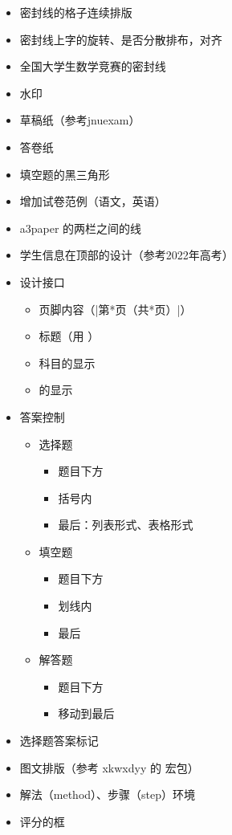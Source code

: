 \documentclass{ccnudoc}
\begin{document}
\begin{itemize}
  \item 密封线的格子连续排版
  \item 密封线上字的旋转、是否分散排布，对齐
  \item 全国大学生数学竞赛的密封线
  \item 水印
  \item 草稿纸（参考jnuexam）
  \item 答卷纸
  \item 填空题的黑三角形
  \item 增加试卷范例（语文，英语）
  \item a3paper 的两栏之间的线
    \begin{latexcode}[gobble = 6]
      \setlength{\columnseprule}{0.4pt}
    \end{latexcode}
  \item 学生信息在顶部的设计（参考2022年高考）
  \item 设计接口
    \begin{itemize}
      \item 页脚内容（|第*页（共*页）|）
      \item 标题（用 ）
      \item 科目的显示
      \item {} 的显示
    \end{itemize}
  \item 答案控制
    \begin{itemize}
      \item 选择题
        \begin{itemize}
          \item 题目下方
          \item 括号内
          \item 最后：列表形式、表格形式
        \end{itemize}
      \item 填空题
        \begin{itemize}
          \item 题目下方
          \item 划线内
          \item 最后
        \end{itemize}
      \item 解答题
        \begin{itemize}
          \item 题目下方
          \item 移动到最后
        \end{itemize}
    \end{itemize}
  \item 选择题答案标记
  \item 图文排版（参考 xkwxdyy 的  宏包）
  \item 解法（method）、步骤（step）环境
  \item 评分的框
\end{itemize}

\end{document}
